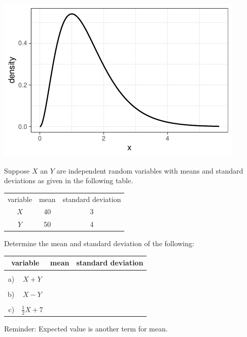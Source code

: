 \documentclass[twoside]{book}\usepackage[]{graphicx}\usepackage[]{xcolor}
\makeatletter
\def\maxwidth{ %
  \ifdim\Gin@nat@width>\linewidth
    \linewidth
  \else
    \Gin@nat@width
  \fi
}
\newenvironment{knitrout}{}{} %
\makeatother
\begin{document}
\begin{solution}
\begin{knitrout}
{\centering \includegraphics[width=\maxwidth]{figures/fig-unnamed-chunk-175-1} 

}



\end{knitrout}
\end{solution}

	
\begin{problem}
Suppose $X$ an $Y$ are independent random variables with means and 
standard deviations as given in the following table.

\begin{center}
\begin{tabular}{ccc}
variable & mean & standard deviation  \\
$X$ & 40 & 3 \\
$Y$ & 50 & 4 \\
\end{tabular}
\end{center}

Determine the mean and standard deviation of the following:
\begin{center}
\begin{tabular}{|rc|p{2in}|p{2in}|}
\hline
\multicolumn{2}{|c|}{variable} & \multicolumn{1}{c|}{mean} & \multicolumn{1}{c|}{standard deviation}\\[2mm]
\hline
&&& \\
a)& $X + Y$  & & \\[6mm]
\hline
&&& \\
b)& $X - Y$  & & \\[6mm]
\hline
&&& \\
c)& $\frac{1}{2} X + 7$  & & \\[6mm]
\hline
\end{tabular}
\end{center}

Reminder: Expected value is another term for mean.
\end{problem}
\end{document}
